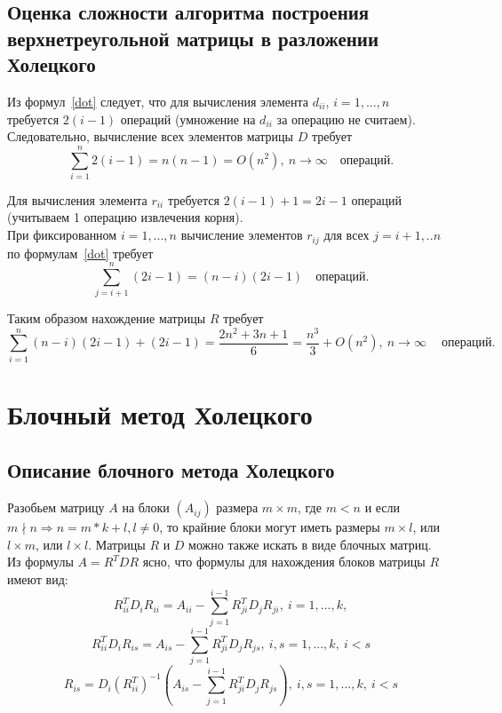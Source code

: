 \documentclass[a4paper,12pt]{article}
\begin{document}
\newpage
\subsection{Оценка сложности алгоритма построения \\ верхнетреугольной матрицы
в разложении Холецкого}

    Из формул~\eqref{dot} следует, что для вычисления элемента $d_{ii}$, $i=1,...,n$\\
    требуется $2 (i-1)$ операций (умножение на $d_{ii}$ за операцию не считаем). \\
    Следовательно, вычисление всех элементов матрицы $D$ требует \\
    $$
        \sum_{i=1}^n 2(i-1) = n(n-1) = O(n^2), \
        n \rightarrow \infty 
        \quad \text{операций.}
    $$
    
    Для вычисления элемента $r_{ii}$ требуется $2 (i-1) + 1 = 2i - 1$ операций 
    (учитываем 1 операцию извлечения корня). \\
    При фиксированном $i=1,...,n$ вычисление элементов $r_{ij}$ для всех 
    $j=i+1,..n$ по формулам~\eqref{dot} требует 
    $$\sum_{j=i+1}^n(2i - 1) = (n-i)(2i - 1) \quad \text{операций.}$$ 

    Таким образом нахождение матрицы $R$ требует 
    $$
        \sum_{i=1}^n(n-i)(2i - 1)+(2i - 1) = 
        \frac{2n^2 + 3n + 1}6  =  \frac{n^3}3 + O(n^2), \
        n \rightarrow \infty \
        \quad \text{операций.}
    $$


\newpage
\section{Блочный метод Холецкого}
\subsection{Описание блочного метода Холецкого}
    Разобьем матрицу $A$ на блоки $(A_{ij})$ размера $m \times m$, где $m < n$ и 
    если $m \nmid n \Rightarrow n = m*k + l, l \neq 0$, то крайние блоки могут иметь 
    размеры $m \times l$, или $l \times m$, или $l \times l$. 
    Матрицы $R$ и $D$ можно также искать в виде блочных матриц. \\
    
    Из формулы $A = R^TDR$ ясно, что формулы для нахождения блоков 
    матрицы $R$ имеют вид:
    \begin{equation} \label{block_i}
        R_{ii}^T D_i R_{ii}  = A_{ii} - 
        \sum_{j=1}^{i-1} R_{ji}^T D_j R_{ji},\  
        i=1,...,k,
     \end{equation}
    $$
        R_{ii}^T D_i R_{is}  = A_{is} - 
        \sum_{j=1}^{i-1} R_{ji}^T D_j R_{js},\  
        i, s = 1,...,k, \ i < s
    $$
    \begin{equation} \label{block_is}
        R_{is} = D_i(R_{ii}^T)^{-1}(A_{is} - 
        \sum_{j=1}^{i-1} R_{ji}^T D_j R_{js}),\  
        i, s = 1,...,k, \ i < s
    \end{equation}
    
\end{document}
